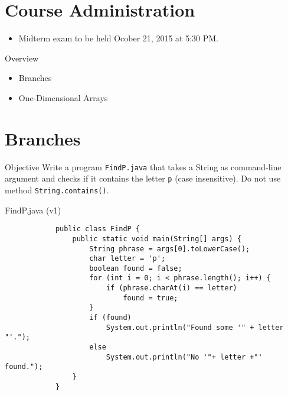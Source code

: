 \documentclass[10pt, compress]{beamer}
\begin{document}
\prepareCover

\section{Course Administration}

\begin{slide}
	\begin{itemize}
		\item[] Midterm exam to be held Ocober 21, 2015 at 5:30 PM.
	\end{itemize}
\end{slide}

\begin{slide}
	\begin{block}{Overview}
		\begin{itemize}
			\item[] Branches
			\item[] One-Dimensional Arrays
		\end{itemize}
	\end{block}
\end{slide}

\section{Branches}

\begin{slide}
	\begin{block}{Objective}
		Write a program \texttt{FindP.java} that takes a String as command-line argument and checks if it contains the letter \texttt{p} (case insensitive). Do not use method \texttt{String.contains()}.
	\end{block}
\end{slide}

\begin{slide}
	\begin{block}{FindP.java (v1)}
		\begin{verbatim}
			public class FindP {
			    public static void main(String[] args) {
			        String phrase = args[0].toLowerCase();
			        char letter = 'p';
			        boolean found = false;
			        for (int i = 0; i < phrase.length(); i++) {
			            if (phrase.charAt(i) == letter)
			                found = true;
			        }
			        if (found)
			            System.out.println("Found some '" + letter "'.");
			        else
			            System.out.println("No '"+ letter +"' found.");
			    }
			}
		\end{verbatim}
	\end{block}
\end{slide}
\end{document}
